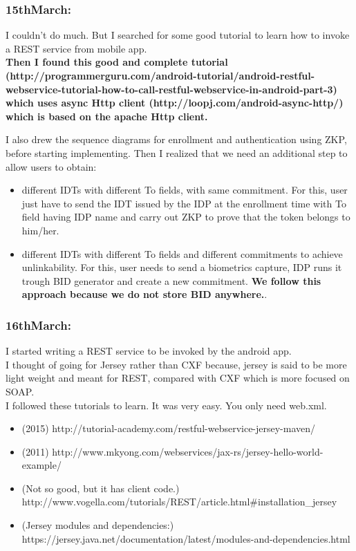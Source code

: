 \documentclass[11pt]{article}
\begin{document}
\subsubsection*{15thMarch:}
I couldn't do much. But I searched for some good tutorial to learn how to invoke a REST service from mobile app.\\

\textbf{Then I found this good and complete tutorial 
(http://programmerguru.com/android-tutorial/android-restful-webservice-tutorial-how-to-call-restful-webservice-in-android-part-3) which uses 
async Http client (http://loopj.com/android-async-http/) which is based on the apache Http client.}

I also drew the sequence diagrams for enrollment and authentication using ZKP, before starting implementing. Then I realized that we need an 
additional step to allow users to obtain:\\
\begin{itemize}
 \item different IDTs with different To fields, with same commitment. For this, user just have to send the IDT issued by the IDP at the enrollment 
time with To field having IDP name and carry out ZKP to prove that the token belongs to him/her.
 \item different IDTs with different To fields and different commitments to achieve unlinkability. For this, user needs to send a biometrics capture, 
IDP runs it trough BID generator and create a new commitment. \textbf{We follow this approach because we do not store BID anywhere.}.
\end{itemize}

\subsubsection*{16thMarch:}
I started writing a REST service to be invoked by the android app. \\

I thought of going for Jersey rather than CXF because, jersey is said to be more light weight and meant for REST, compared with CXF which is more 
focused on SOAP.\\

I followed these tutorials to learn. It was very easy. You only need web.xml.\\
\begin{itemize}
 \item (2015) http://tutorial-academy.com/restful-webservice-jersey-maven/
 \item (2011) http://www.mkyong.com/webservices/jax-rs/jersey-hello-world-example/
 \item (Not so good, but it has client code.) http://www.vogella.com/tutorials/REST/article.html\#installation\_jersey
 \item (Jersey modules and dependencies:) https://jersey.java.net/documentation/latest/modules-and-dependencies.html
\end{itemize}
\end{document}
